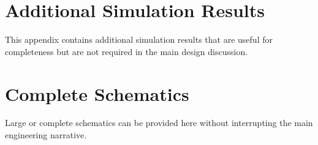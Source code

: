 
\clearpage

\appendix

\section{Additional Simulation Results}
\label{app:additional_results}

This appendix contains additional simulation results that are useful
for completeness but are not required in the main design discussion.

\section{Complete Schematics}
\label{app:schematics}

Large or complete schematics can be provided here without interrupting
the main engineering narrative.
